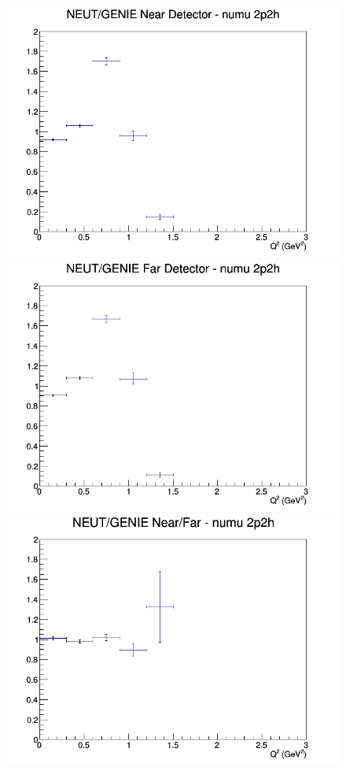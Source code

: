 \begin{figure}[h]
\endminipage
\newline
{}
\includegraphics[width=\linewidth]{Q2/nominal/ratios/2p2h_NEUT_GENIE_numu_near_Q2.png}
\endminipage
{}
\includegraphics[width=\linewidth]{Q2/nominal/ratios/2p2h_NEUT_GENIE_numu_far_Q2.png}
\endminipage
{}
\includegraphics[width=\linewidth]{Q2/nominal/ratios/2p2h_NEUT_GENIE_numu_NF_Q2.png}

\end{figure}
